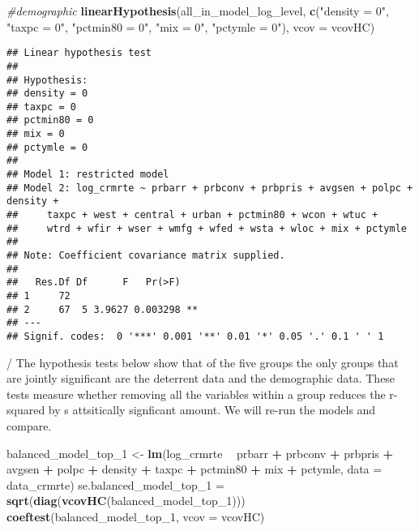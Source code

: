\documentclass[
]{article}
\newenvironment{Shaded}{\begin{snugshade}}{\end{snugshade}}
\newcommand{\CommentTok}[1]{\textcolor[rgb]{0.56,0.35,0.01}{\textit{#1}}}
\newcommand{\DataTypeTok}[1]{\textcolor[rgb]{0.13,0.29,0.53}{#1}}
\newcommand{\DecValTok}[1]{\textcolor[rgb]{0.00,0.00,0.81}{#1}}
\newcommand{\KeywordTok}[1]{\textcolor[rgb]{0.13,0.29,0.53}{\textbf{#1}}}
\newcommand{\NormalTok}[1]{#1}
\newcommand{\OperatorTok}[1]{\textcolor[rgb]{0.81,0.36,0.00}{\textbf{#1}}}
\newcommand{\StringTok}[1]{\textcolor[rgb]{0.31,0.60,0.02}{#1}}
\begin{document}
\begin{Shaded}
\begin{Highlighting}[]
\CommentTok{#demographic}
\KeywordTok{linearHypothesis}\NormalTok{(all_in_model_log_level, }
                 \KeywordTok{c}\NormalTok{(}\StringTok{"density = 0"}\NormalTok{, }\StringTok{"taxpc = 0"}\NormalTok{, }\StringTok{"pctmin80 = 0"}\NormalTok{,}
                   \StringTok{"mix = 0"}\NormalTok{, }\StringTok{"pctymle = 0"}\NormalTok{), }
                 \DataTypeTok{vcov =}\NormalTok{ vcovHC)}
\end{Highlighting}
\end{Shaded}

\begin{verbatim}
## Linear hypothesis test
## 
## Hypothesis:
## density = 0
## taxpc = 0
## pctmin80 = 0
## mix = 0
## pctymle = 0
## 
## Model 1: restricted model
## Model 2: log_crmrte ~ prbarr + prbconv + prbpris + avgsen + polpc + density + 
##     taxpc + west + central + urban + pctmin80 + wcon + wtuc + 
##     wtrd + wfir + wser + wmfg + wfed + wsta + wloc + mix + pctymle
## 
## Note: Coefficient covariance matrix supplied.
## 
##   Res.Df Df      F   Pr(>F)   
## 1     72                      
## 2     67  5 3.9627 0.003298 **
## ---
## Signif. codes:  0 '***' 0.001 '**' 0.01 '*' 0.05 '.' 0.1 ' ' 1
\end{verbatim}

/ The hypothesis tests below show that of the five groups the only
groups that are jointly significant are the deterrent data and the
demographic data. These tests measure whether removing all the variables
within a group reduces the r-squared by s attsitically signficant
amount. We will re-run the models and compare.

\begin{Shaded}
\begin{Highlighting}[]
\NormalTok{balanced_model_top_}\DecValTok{1}\NormalTok{ <-}\StringTok{ }\KeywordTok{lm}\NormalTok{(log_crmrte }\OperatorTok{~}\StringTok{ }\NormalTok{prbarr }\OperatorTok{+}\StringTok{ }\NormalTok{prbconv }\OperatorTok{+}\StringTok{ }\NormalTok{prbpris }
                             \OperatorTok{+}\StringTok{ }\NormalTok{avgsen }\OperatorTok{+}\StringTok{ }\NormalTok{polpc }\OperatorTok{+}\StringTok{ }\NormalTok{density}
                             \OperatorTok{+}\StringTok{ }\NormalTok{taxpc }\OperatorTok{+}\StringTok{ }\NormalTok{pctmin80 }\OperatorTok{+}\StringTok{ }\NormalTok{mix }\OperatorTok{+}\StringTok{ }\NormalTok{pctymle,}
                             \DataTypeTok{data =}\NormalTok{ data_crmrte)}
\NormalTok{se.balanced_model_top_}\DecValTok{1}\NormalTok{ =}\StringTok{ }\KeywordTok{sqrt}\NormalTok{(}\KeywordTok{diag}\NormalTok{(}\KeywordTok{vcovHC}\NormalTok{(balanced_model_top_}\DecValTok{1}\NormalTok{)))}
\KeywordTok{coeftest}\NormalTok{(balanced_model_top_}\DecValTok{1}\NormalTok{, }\DataTypeTok{vcov =}\NormalTok{ vcovHC)}
\end{Highlighting}
\end{Shaded}
\end{document}
